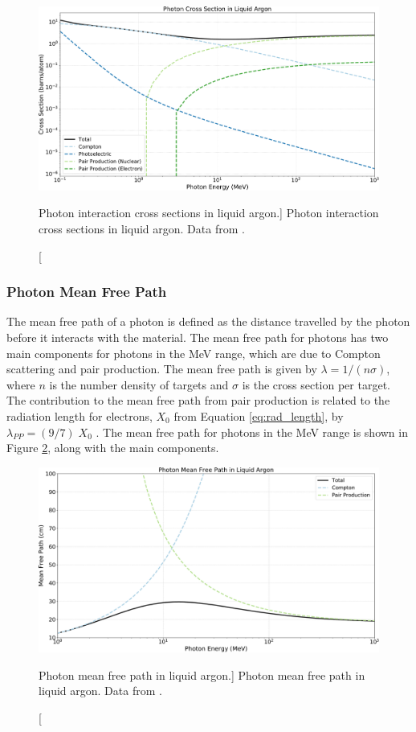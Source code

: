 \begin{figure}

	\centering

	\includegraphics[width=\textwidth]{figures/photon_xsec.pdf}

	\caption
	[Photon interaction cross sections in liquid argon.]
	{ Photon interaction cross sections in liquid argon. Data from
	\cite{photon_xsec}.}

	\label{fig:photon_xsec}

\end{figure}

\subsubsection*{Photon Mean Free Path}
The mean free path of a photon is defined as the distance travelled by the
photon before it interacts with the material. The mean free path for photons
has two main components for photons in the MeV range, which are due to Compton
scattering and pair production. The mean free path is given by $\lambda = 1 / (n
\sigma)$, where $n$ is the number density of targets and $\sigma$ is the cross
section per target. The contribution to the mean free path from pair production
is related to the radiation length for electrons, $X_0$ from Equation
\ref{eq:rad_length}, by $\lambda_{PP} = (9/7) \; X_0$ \cite{PhysRevD.98.030001}.
The mean free path for photons in the MeV range is shown in Figure
\ref{fig:photon_mfp}, along with the main components. 

\begin{figure}

	\centering

	\includegraphics[width=\textwidth]{figures/photon_mfp.pdf}

	\caption
	[Photon mean free path in liquid argon.]
	{Photon mean free path in liquid argon. Data from \cite{photon_xsec}.}

	\label{fig:photon_mfp}

\end{figure}
